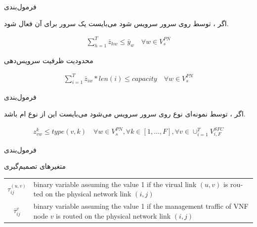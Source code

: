 \documentclass{beamer}
\begin{document}
\begin{persian}
\begin{frame}{فرمول‌بندی} %
    \par
    اگر ، 
    توسط  روی سرور 
    سرویس شود می‌بایست یک  سرور 
    برای آن فعال شود.
    \begin{latin}\begin{align}
        \sum_{h=1}^T
        \bar{z}_{hw} \le \bar{y}_w
        \quad
        \forall w \in V_{s}^{PN}
    \end{align}\end{latin}
    \par
    محدودیت ظرفیت سرویس‌دهی 
    \begin{latin}\begin{align}
        \sum_{i=1}^{T} \bar{z}_{iw} * len(i) \le capacity
        \quad
        \forall w \in V_{s}^{PN}
    \end{align}\end{latin}
\end{frame}
\begin{frame}{فرمول‌بندی} %
    \par
    اگر ، 
    توسط نمونه‌ای نوع 
    روی سرور  سرویس می‌شود می‌بایست
    این  از نوع ام باشد.
    \begin{latin}\begin{align}
        z_{vw}^{k} \le type(v, k)
        \quad
        \forall w \in V_{s}^{PN},
        \forall k \in [1,\ldots, F],
        \forall v \in \cup_{i=1}^T V_{i, F}^{SFC}
    \end{align}\end{latin}
\end{frame}
\begin{frame}{فرمول‌بندی} %
    \par
    متغیرهای تصمیم‌گیری
    \begin{latin}\begin{tabular}{c p{10cm}}
        $\tau^{(u,v)}_{ij}$ & binary variable assuming the value 1 if the virual link $(u,v)$ is routed on the physical network link $(i,j)$\\
        $\bar{\tau}^{v}_{ij}$ & binary variable assuming the value 1 if the management traffic of VNF node $v$ is routed on the physical network link $(i,j)$\\

\end{tabular}
\end{latin}
\end{frame}
\end{persian}
\end{document}
